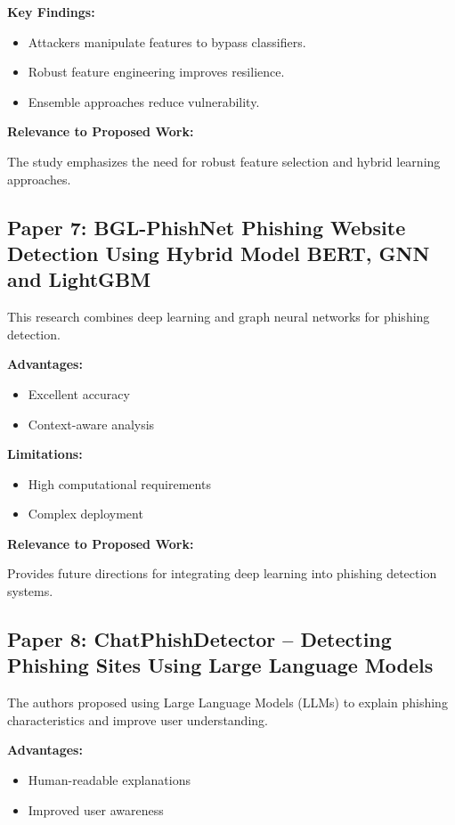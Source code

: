 \documentclass[12pt]{report}
\begin{document}
\textbf{Key Findings:}
\begin{itemize}
    \item Attackers manipulate features to bypass classifiers.
    \item Robust feature engineering improves resilience.
    \item Ensemble approaches reduce vulnerability.
\end{itemize}

\textbf{Relevance to Proposed Work:}

The study emphasizes the need for robust feature selection and hybrid learning approaches.

\subsection{Paper 7: BGL-PhishNet Phishing Website Detection Using Hybrid Model BERT, GNN and LightGBM}

This research combines deep learning and graph neural networks for phishing detection.

\textbf{Advantages:}
\begin{itemize}
    \item Excellent accuracy
    \item Context-aware analysis
\end{itemize}

\textbf{Limitations:}
\begin{itemize}
    \item High computational requirements
    \item Complex deployment
\end{itemize}

\textbf{Relevance to Proposed Work:}

Provides future directions for integrating deep learning into phishing detection systems.

\subsection{Paper 8: ChatPhishDetector – Detecting Phishing Sites Using Large Language Models}

The authors proposed using Large Language Models (LLMs) to explain phishing characteristics and improve user understanding.

\textbf{Advantages:}
\begin{itemize}
    \item Human-readable explanations
    \item Improved user awareness
\end{itemize}
\end{document}
